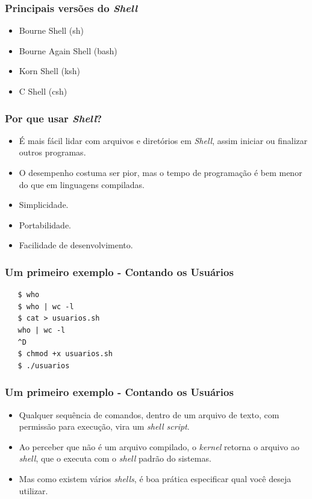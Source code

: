 \documentclass{beamer}
\begin{document}
   \begin{frame}
      \frametitle{Principais versões do \textit{Shell}}
      \begin{itemize}
         \item Bourne Shell (sh)
         \item Bourne Again Shell (bash)
         \item Korn Shell (ksh)
         \item C Shell (csh)
      \end{itemize}
   \end{frame}

\begin{frame}
   \frametitle{Por que usar \textit{Shell}?}
   \begin{itemize}
      \item É mais fácil lidar com arquivos e diretórios em \textit{Shell}, assim iniciar ou finalizar outros programas.
      \item O desempenho costuma ser pior, mas o tempo de programação é bem menor do que em linguagens compiladas.
      \item Simplicidade.
      \item Portabilidade.
      \item Facilidade de desenvolvimento.
   \end{itemize}
\end{frame}


\begin{frame}[fragile]
   \frametitle{Um primeiro exemplo - Contando os Usuários}
   \begin{verbatim}
   $ who
   $ who | wc -l
   $ cat > usuarios.sh
   who | wc -l
   ^D
   $ chmod +x usuarios.sh
   $ ./usuarios
   \end{verbatim}
\end{frame}

\begin{frame}[fragile]
   \frametitle{Um primeiro exemplo - Contando os Usuários}
   \begin{itemize}
      \item Qualquer sequência de comandos, dentro de um arquivo de texto, com permissão para execução, vira um \textit{shell script}.
      \item Ao perceber que não é um arquivo compilado, o \textit{kernel} retorna o arquivo ao \textit{shell}, que o executa com o \textit{shell} padrão do sistemas.
      \item Mas como existem vários \textit{shells}, é boa prática especificar qual você deseja utilizar. 
   \end{itemize}
\end{frame}
\end{document}
